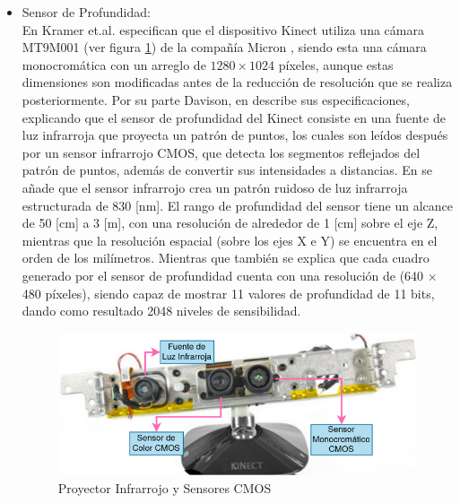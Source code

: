             \begin{itemize}
                \item Sensor de Profundidad: \\
                En \cite{kramer_hacking_2012} Kramer et.al. especifican que el dispositivo Kinect utiliza una cámara MT9M001 (ver figura \ref{fig:Kinect_Sensors}) de la compañía Micron \cite{micron_12-inch_2004}, siendo esta una cámara monocromática con un arreglo de $1280\times1024$ píxeles, aunque estas dimensiones son modificadas antes de la reducción de resolución que se realiza posteriormente.
                Por su parte Davison, en \cite{davison_kinect_2012} describe sus especificaciones, explicando que el sensor de profundidad del Kinect consiste en una fuente de luz infrarroja que proyecta un patrón de puntos, los cuales son leídos después por un sensor infrarrojo CMOS, que detecta los segmentos reflejados del patrón de puntos, además de convertir sus intensidades a distancias. En  \cite{kramer_hacking_2012} se añade que el sensor infrarrojo crea un patrón ruidoso de luz infrarroja estructurada de 830 [nm]. El rango de profundidad del sensor tiene un alcance de 50 [cm] a 3 [m], con una resolución de alrededor de 1 [cm] sobre el eje Z, mientras que la resolución espacial (sobre los ejes X e Y) se encuentra en el orden de los milímetros. Mientras que \cite{davison_kinect_2012} también se explica que cada cuadro generado por el sensor de profundidad cuenta con una resolución de (640 $\times$ 480 píxeles), siendo capaz de mostrar 11 valores de profundidad de 11 bits, dando como resultado 2048 niveles de sensibilidad.

                \begin{figure}[ht]
                    \centering
                    \includegraphics[scale=0.35]{Figures/Kinect_open.png}
                    \caption{Proyector Infrarrojo y Sensores CMOS \cite{eetimes_inside_2010}}
                    \label{fig:Kinect_Sensors}
                \end{figure}



\end{itemize}
